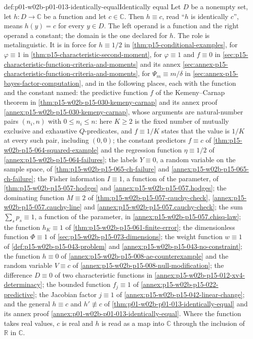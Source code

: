 \begin{hbconvention}{def:p01-w02b-p01-013-identically-equal}{Identically equal}
Let \(D\) be a nonempty set, let \(h:D\to\mathbb C\) be a function and let
\(c\in\mathbb C\).  Then \(h\equiv c\), read ``\(h\) is identically
\(c\)'', means \(h(y)=c\) for every \(y\in D\).  The left operand is a
function and the right operand a constant; the domain is the one declared for
\(h\).  The role is metalinguistic.  It is in force for \(h\equiv1/2\) in
\cref{thm:p15-conditional-examples}, for \(\varphi\equiv1\) in
\cref{thm:p15-characteristic-second-moment}, for \(\varphi\equiv1\) and
\(f\equiv0\) in \cref{sec:p15-characteristic-function-criteria-and-moments}
and its annex \cref{sec:annex-p15-characteristic-function-criteria-and-moments},
for \(\Psi_m\equiv m/\delta\) in
\cref{sec:annex-p15-bayes-factor-computation}, and in the following
places, each with the function and the constant named:
the predictive function \(f\) of the Kemeny--Carnap theorem in
\cref{thm:p15-w02b-p15-030-kemeny-carnap} and its annex proof
\cref{annex:p15-w02b-p15-030-kemeny-carnap}, whose arguments are
natural-number pairs \((n_i,n)\) with \(0\leq n_i\leq n\): here
\(K\geq2\) is the fixed number of mutually exclusive and exhaustive
\(Q\)-predicates, and \(f\equiv1/K\) states that the value is
\(1/K\) at every such pair, including \((0,0)\);
the constant predictors \(f\equiv c\) of
\cref{thm:p15-w02b-p15-064-squared-example} and the regression function
\(\eta\equiv1/2\) of \cref{annex:p15-w02b-p15-064-failures};
the labels \(Y\equiv0\), a random variable on the sample space, of
\cref{thm:p15-w02b-p15-065-ch-failure} and
\cref{annex:p15-w02b-p15-065-ch-failure};
the Fisher information \(I\equiv1\), a function of the parameter, of
\cref{thm:p15-w02b-p15-057-hodges} and \cref{annex:p15-w02b-p15-057.hodges};
the dominating function \(M\equiv2\) of
\cref{thm:p15-w02b-p15-057-cauchy-check},
\cref{annex:p15-w02b-p15-057.cauchy-line} and
\cref{annex:p15-w02b-p15-057.cauchy-check};
the sum \(\sum_sp_s\equiv1\), a function of the parameter, in
\cref{annex:p15-w02b-p15-057.chisq-law};
the function \(h_K\equiv1\) of \cref{thm:p15-w02b-p15-061-finite-error};
the dimensionless function \(\Phi\equiv1\) of
\cref{sec:p15-w02b-p15-073-dimensions};
the weight function \(w\equiv1\) of \cref{def:p15-w02b-p15-043-problem}
and \cref{annex:p15-w02b-p15-043-no-constraint};
the function \(h\equiv0\) of \cref{annex:p15-w02b-p15-008-ae-counterexample}
and the random variable \(V\equiv c\) of
\cref{annex:p15-w02b-p15-008-null-modification};
the difference \(D\equiv0\) of two characteristic functions in
\cref{annex:p15-w02b-p15-012-xv4-determinacy};
the bounded function \(f_j\equiv1\) of
\cref{annex:p15-w02b-p15-022-predictive};
the Jacobian factor \(j\equiv1\) of
\cref{annex:p15-w02b-p15-042-linear-change};
and the general \(h\equiv c\) and \(h'\not\equiv c\) of
\cref{thm:p01-w02b-p01-013-identically-equal} and its annex proof
\cref{annex:p01-w02b-p01-013-identically-equal}.  Where the function
takes real values, \(c\) is real and \(h\) is read as a map into
\(\mathbb C\) through the inclusion of \(\mathbb R\) in \(\mathbb C\).
\end{hbconvention}

